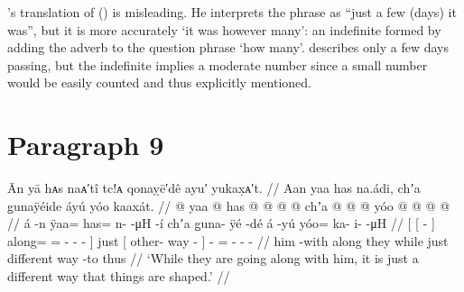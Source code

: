 \citeauthor{swanton:1909}’s translation of (\lastx) is misleading.
He interprets the phrase  as “just a few (days) it was”, but it is 
more accurately ‘it was however many’: an indefinite formed by adding the adverb  to the question phrase  ‘how many’.
\citeauthor{swanton:1909} describes only a few days passing, but the indefinite implies a moderate number since a small number would be easily counted and thus explicitly mentioned.

\section{Paragraph 9}\label{sec:92-para-9}

\ex\label{ex:92-165-going-along-different-shape}%
%
\begingl
	\glpreamble	Ān yā hᴀs naᴀ′tî tc!ᴀ qonaỵē′dê ayu′ yukax̣ᴀ′t. //
	\glpreamble	Aan yaa has na.ádi, chʼa g̱unaÿéide áyú yóo kaaxát. //
	\gla	{} {}  @ {} {} yaa @ has @  @ {} @ {} @ {} {}
		chʼa {}  @ {} @ {} {}  @ {}
		yóo @  @ {} @ {} @ {} //
	\glb	{} {} á -n {} ÿaa= has= n-  -μH -í {}
		chʼa {} g̱una- ÿé -dé {} á -yú
		yóo= ka- i-  -μH //
	\glc	{}[ {}[  - {}]
		along= = -  - - {}]
		just {}[ other- way - {}]  -
		= - -  - //
	\gld	{} {} him -with {} along they  {} {} while {}
		just {} different way -to {}  {}
		thus  {} {} {} //
	\glft	‘While they are going along with him, it is just a different way that things are shaped.’
		//
\endgl
\xe

